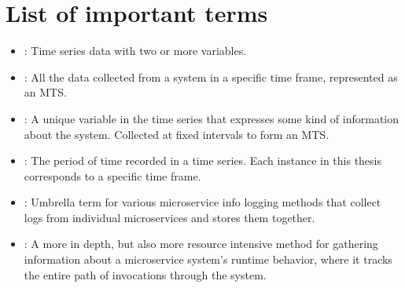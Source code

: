 \section{List of important terms}
\begin{itemize}
	\item {}: Time series data with two or more variables.
	\item {}: All the data collected from a system in a specific time frame, represented as an MTS.
	\item {}: A unique variable in the time series that expresses some kind of information about the system. Collected at fixed intervals to form an MTS.
	\item {}: The period of time recorded in a time series. Each instance in this thesis corresponds to a specific time frame.
	\item {}: Umbrella term for various microservice info logging methods that collect logs from individual microservices and stores them together.
	\item {}: A more in depth, but also more resource intensive method for gathering information about a microservice system's runtime behavior, where it tracks the entire path of invocations through the system.
\end{itemize}

